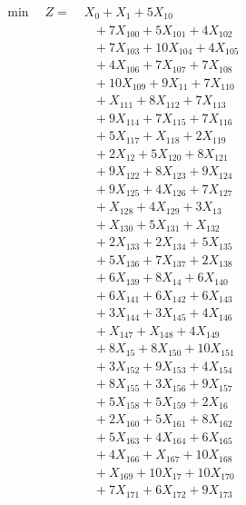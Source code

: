 \documentclass[a4paper,10pt]{article}
\begin{document}
\allowdisplaybreaks
{\small
\begin{align}
\min \quad Z = &\; X_{0} + X_{1} + 5X_{10} \\[0.5ex]
&\quad  + 7X_{100} + 5X_{101} + 4X_{102} \\[0.5ex]
&\quad  + 7X_{103} + 10X_{104} + 4X_{105} \\[0.5ex]
&\quad  + 4X_{106} + 7X_{107} + 7X_{108} \\[0.5ex]
&\quad  + 10X_{109} + 9X_{11} + 7X_{110} \\[0.5ex]
&\quad  + X_{111} + 8X_{112} + 7X_{113} \\[0.5ex]
&\quad  + 9X_{114} + 7X_{115} + 7X_{116} \\[0.5ex]
&\quad  + 5X_{117} + X_{118} + 2X_{119} \\[0.5ex]
&\quad  + 2X_{12} + 5X_{120} + 8X_{121} \\[0.5ex]
&\quad  + 9X_{122} + 8X_{123} + 9X_{124} \\[0.5ex]
&\quad  + 9X_{125} + 4X_{126} + 7X_{127} \\[0.5ex]
&\quad  + X_{128} + 4X_{129} + 3X_{13} \\[0.5ex]
&\quad  + X_{130} + 5X_{131} + X_{132} \\[0.5ex]
&\quad  + 2X_{133} + 2X_{134} + 5X_{135} \\[0.5ex]
&\quad  + 5X_{136} + 7X_{137} + 2X_{138} \\[0.5ex]
&\quad  + 6X_{139} + 8X_{14} + 6X_{140} \\[0.5ex]
&\quad  + 6X_{141} + 6X_{142} + 6X_{143} \\[0.5ex]
&\quad  + 3X_{144} + 3X_{145} + 4X_{146} \\[0.5ex]
&\quad  + X_{147} + X_{148} + 4X_{149} \\[0.5ex]
&\quad  + 8X_{15} + 8X_{150} + 10X_{151} \\[0.5ex]
&\quad  + 3X_{152} + 9X_{153} + 4X_{154} \\[0.5ex]
&\quad  + 8X_{155} + 3X_{156} + 9X_{157} \\[0.5ex]
&\quad  + 5X_{158} + 5X_{159} + 2X_{16} \\[0.5ex]
&\quad  + 2X_{160} + 5X_{161} + 8X_{162} \\[0.5ex]
&\quad  + 5X_{163} + 4X_{164} + 6X_{165} \\[0.5ex]
&\quad  + 4X_{166} + X_{167} + 10X_{168} \\[0.5ex]
&\quad  + X_{169} + 10X_{17} + 10X_{170} \\[0.5ex]
&\quad  + 7X_{171} + 6X_{172} + 9X_{173} \\[0.5ex]

\end{align}}
\end{document}
